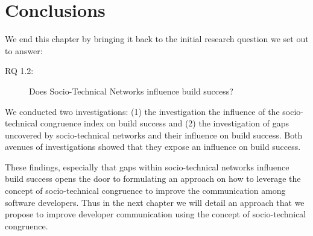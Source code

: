 \section{Conclusions}
\label{sec:conclusion}
We end this chapter by bringing it back to the initial research question we set out to answer:
\begin{description}
  \item[RQ 1.2:] Does Socio-Technical Networks influence build success?
\end{description}

We conducted two investigations: (1) the investigation the influence of the socio-technical congruence index on build success and (2) the investigation of gaps uncovered by socio-technical networks and their influence on build success.
Both avenues of investigations showed that they expose an influence on build success.

These findings, especially that gaps within socio-technical networks influence build success opens the door to formulating an approach on how to leverage the concept of socio-technical congruence to improve the communication among software developers.
Thus in the next chapter we will detail an approach that we propose to improve developer communication using the concept of socio-technical congruence.

